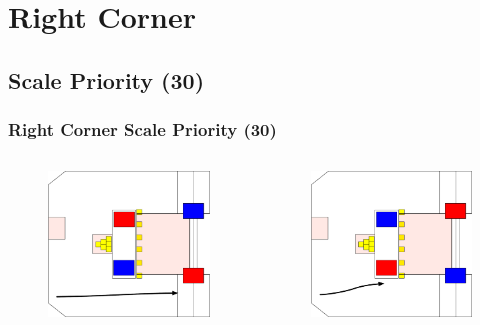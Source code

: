 \documentclass{beamer}
\begin{document}
\section{Right Corner}
\subsection{Scale Priority (30)}

\begin{frame}
 \frametitle{Right Corner Scale Priority \alert{(30)}}
 \begin{columns}
  \begin{figure}
   \includegraphics[scale=0.15]{assets/paths/30_LR}
  \end{figure}
  \begin{figure}
   \includegraphics[scale=0.15]{assets/paths/30_RL}

\end{figure}
\end{columns}
\end{frame}
\end{document}
